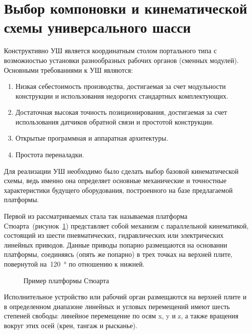 \section{Выбор компоновки и кинематической схемы универсального шасси}

Конструктивно УШ является координатным столом портального типа с возможностью установки разнообразных рабочих органов (сменных модулей). Основными требованиями к УШ являются:

\begin{enumerate}
	\item Низкая себестоимость производства, достигаемая за счет модульности конструкции и использования недорогих стандартных комплектующих.
	\item Достаточная высокая точность позиционирования, достигаемая за счет использования датчиков обратной связи и простотой конструкции.
	\item Открытые программная и аппаратная архитектуры.
	\item Простота переналадки.
\end{enumerate}

Для реализации УШ необходимо было сделать выбор базовой кинематической схемы, ведь именно она определяет основные механические и точностные характеристики будущего оборудования, построенного на базе предлагаемой платформы.

Первой из рассматриваемых стала так называемая платформа Стюарта~(рисунок~\cref{fig:stuart}) представляет собой механизм с параллельной кинематикой, состоящий из шести пневматических, гидравлических или электрических линейных приводов. Данные приводы попарно размещаются на основании платформы, соединяясь (опять же попарно) в трех точках на верхней плите, повернутой на~\SI{120}{\degree} по отношению к нижней.

\begin{figure}[ht]
	\caption{Пример платформы Стюарта}\label{fig:stuart}
\end{figure}

Исполнительное устройство или рабочий орган размещаются на верхней плите и в определенном диапазоне линейных и угловых перемещений имеют шесть степеней свободы: линейное перемещение по осям x, y и z, а также вращения вокруг этих осей (крен, тангаж и рысканье).

